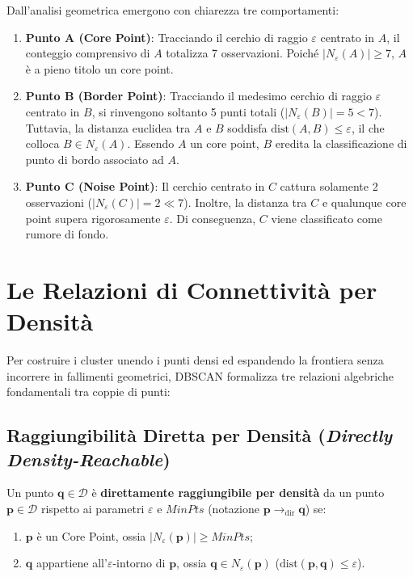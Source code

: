 Dall'analisi geometrica emergono con chiarezza tre comportamenti:
\begin{enumerate}
    \item \textbf{Punto A (Core Point)}: Tracciando il cerchio di raggio $\varepsilon$ centrato in $A$, il conteggio comprensivo di $A$ totalizza 7 osservazioni. Poiché $|N_\varepsilon(A)| \ge 7$, $A$ è a pieno titolo un core point.
    \item \textbf{Punto B (Border Point)}: Tracciando il medesimo cerchio di raggio $\varepsilon$ centrato in $B$, si rinvengono soltanto 5 punti totali ($|N_\varepsilon(B)| = 5 < 7$). Tuttavia, la distanza euclidea tra $A$ e $B$ soddisfa $\mathrm{dist}(A, B) \le \varepsilon$, il che colloca $B \in N_\varepsilon(A)$. Essendo $A$ un core point, $B$ eredita la classificazione di punto di bordo associato ad $A$.
    \item \textbf{Punto C (Noise Point)}: Il cerchio centrato in $C$ cattura solamente 2 osservazioni ($|N_\varepsilon(C)| = 2 \ll 7$). Inoltre, la distanza tra $C$ e qualunque core point supera rigorosamente $\varepsilon$. Di conseguenza, $C$ viene classificato come rumore di fondo.
\end{enumerate}

\FloatBarrier
\section{Le Relazioni di Connettività per Densità}
\label{sec:dm-dbscan-reachability-connectivity}

Per costruire i cluster unendo i punti densi ed espandendo la frontiera senza incorrere in fallimenti geometrici, DBSCAN formalizza tre relazioni algebriche fondamentali tra coppie di punti:

\FloatBarrier
\subsection{Raggiungibilità Diretta per Densità (\textit{Directly Density-Reachable})}

\begin{definition}
Un punto $\mathbf{q} \in \mathcal{D}$ è \textbf{direttamente raggiungibile per densità} da un punto $\mathbf{p} \in \mathcal{D}$ rispetto ai parametri $\varepsilon$ e $MinPts$ (notazione $\mathbf{p} \to_{\mathrm{dir}} \mathbf{q}$) se:
\begin{enumerate}
    \item $\mathbf{p}$ è un Core Point, ossia $|N_\varepsilon(\mathbf{p})| \ge MinPts$;
    \item $\mathbf{q}$ appartiene all'$\varepsilon$-intorno di $\mathbf{p}$, ossia $\mathbf{q} \in N_\varepsilon(\mathbf{p})$ ($\mathrm{dist}(\mathbf{p}, \mathbf{q}) \le \varepsilon$).
\end{enumerate}
\end{definition}

